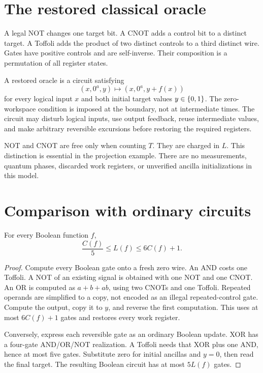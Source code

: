 \section{The restored classical oracle}
A legal NOT changes one target bit. A CNOT adds a control bit to a distinct target. A Toffoli adds the product of two distinct controls to a third distinct wire. Gates have positive controls and are self-inverse. Their composition is a permutation of all register states.

A restored oracle is a circuit satisfying
\begin{equation}\label{c:eq:oracle}
(x,0^a,y)\longmapsto(x,0^a,y+f(x))
\end{equation}
for every logical input $x$ and both initial target values $y\in\{0,1\}$. The zero-workspace condition is imposed at the boundary, not at intermediate times. The circuit may disturb logical inputs, use output feedback, reuse intermediate values, and make arbitrary reversible excursions before restoring the required registers.

NOT and CNOT are free only when counting $T$. They are charged in $L$. This distinction is essential in the projection example. There are no measurements, quantum phases, discarded work registers, or unverified ancilla initializations in this model.

\section{Comparison with ordinary circuits}
\begin{theorem}\label{c:thm:simulation}
For every Boolean function $f$,
\[
\frac{C(f)}5\le L(f)\le6C(f)+1.
\]
\end{theorem}
\begin{proof}
Compute every Boolean gate onto a fresh zero wire. An AND costs one Toffoli. A NOT of an existing signal is obtained with one NOT and one CNOT. An OR is computed as $a+b+ab$, using two CNOTs and one Toffoli. Repeated operands are simplified to a copy, not encoded as an illegal repeated-control gate. Compute the output, copy it to $y$, and reverse the first computation. This uses at most $6C(f)+1$ gates and restores every work register.

Conversely, express each reversible gate as an ordinary Boolean update. XOR has a four-gate AND/OR/NOT realization. A Toffoli needs that XOR plus one AND, hence at most five gates. Substitute zero for initial ancillas and $y=0$, then read the final target. The resulting Boolean circuit has at most $5L(f)$ gates.
\end{proof}

